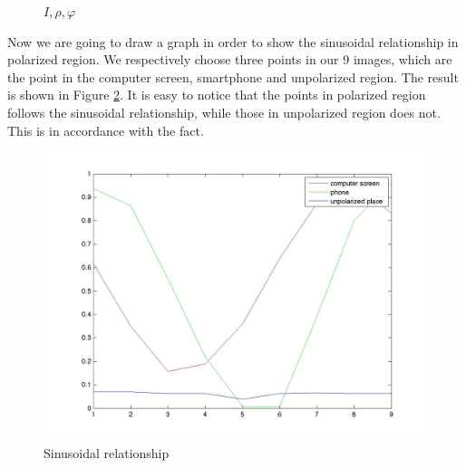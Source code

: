 \documentclass[english]{article}
\begin{document}
\begin{figure}[H]
	\centering
	\caption{$I, \rho, \varphi$}
	\label{fig:five}
\end{figure}

Now we are going to draw a graph in order to show the sinusoidal relationship in polarized region. We respectively choose three points in our 9 images, which are the point in the computer screen, smartphone and unpolarized region. The result is shown in Figure \ref{fig:plot}. It is easy to notice that the points in polarized region follows the sinusoidal relationship, while those in unpolarized region does not. This is in accordance with the fact.
 \begin{figure}[H]
 	\centering
	\includegraphics[width=\linewidth]{Pictures/Least_Mean/sin.jpg}
 	\caption{Sinusoidal relationship }
 	\label{fig:plot}
 \end{figure}
\end{document}
